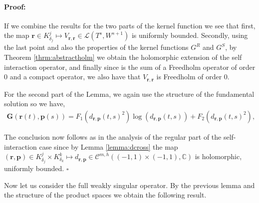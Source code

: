 \documentclass{article}
\newenvironment{proof}{\paragraph{Proof:}}{\hfill$\square$}
\newcommand{\IC}{{\mathbb C}}
\newcommand{\bp}{{\bm p}}
\newcommand{\cmspaceh}[4]{\mathcal{C}^{#1,#2} \left( #3, #4 \right)}
\newcommand{\br}{\bm{r}}
\newcommand{\iinterv}{(-1,1)\times(-1,1)}
\begin{document}
\begin{proof}
If we combine the results for the two parts of the kernel function we see that first, the map $\br \in K^j_{\delta_j} \mapsto V_{\br,\br} \in \mathcal{L}(T^s,W^{s+1})$ is uniformly bounded. Secondly, using the last point and also the properties of the kernel functions $G^R$ and $G^S$, by Theorem \ref{thrm:abstractholm} we obtain the holomorphic extension of the self interaction operator, and  finally since is the sum of a Freedholm operator of order $0$ and a compact operator, we also have that $V_{\br,\br}$ is Freedholm of order $0$. 

For the second part of the Lemma, we again use the structure of the fundamental solution so we have,
\begin{align*}
\mathbf{G}(\br(t),\bp(s)) = F_1(d_{\br,\bp}(t,s)^2) \log(d_{\br,\bp}(t,s)) + F_2(d_{\br,\bp}(t,s)^2),
\end{align*}

 The conclusion now follows as in the analysis of the regular part of the self-interaction case since by Lemma \ref{lemma:dcross} the map $(\br,\bp) \in K^j_{\delta_j} \times K^k_{\delta_k}\mapsto d_{\br,\bp} \in \cmspaceh{m}{h}{\iinterv}{\IC}$ is holomorphic, uniformly bounded. 
\end{proof} 

Now let us consider the full weakly singular operator. By the previous lemma and the structure of the product spaces we obtain the following result. 
\end{document}
